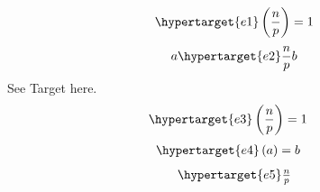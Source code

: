 \documentclass{article}
\begin{document}
\begin{equation}\hypertarget{e1}
  \left( \frac{n}{p}\right) = 1
\end{equation}
\[ a\hypertarget{e2}\frac{n}{p} b \]
See \hypertarget{t1}{Target} here.
\begin{align}\hypertarget{e3}
  \left( \frac{n}{p}\right) &= 1
\end{align}
\begin{equation}\begin{aligned}\hypertarget{e4}\left( a \right) &= b\end{aligned}\end{equation}
\[ \begin{array}{c} \hypertarget{e5}\frac{n}{p} \end{array} \]
\end{document}
